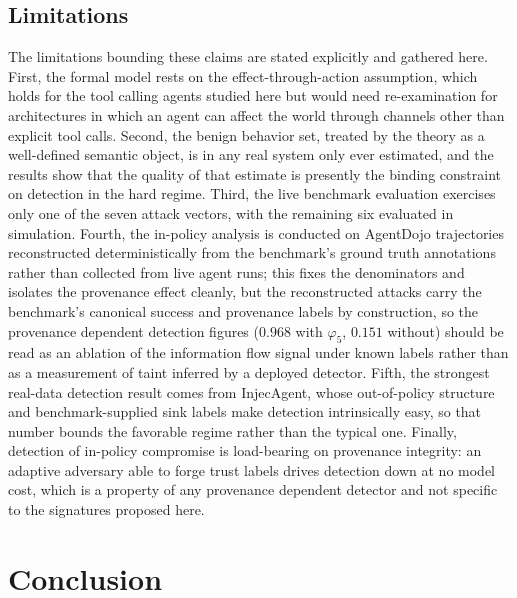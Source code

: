 \documentclass[journal]{IEEEtran}
\theoremstyle{remark}
\begin{document}
\subsection{Limitations}
The limitations bounding these claims are stated explicitly and gathered here. First, the formal model rests on the effect-through-action assumption, which holds for the tool calling agents studied here but would need re-examination for architectures in which an agent can affect the world through channels other than explicit tool calls. Second, the benign behavior set, treated by the theory as a well-defined semantic object, is in any real system only ever estimated, and the results show that the quality of that estimate is presently the binding constraint on detection in the hard regime. Third, the live benchmark evaluation exercises only one of the seven attack vectors, with the remaining six evaluated in simulation. Fourth, the in-policy analysis is conducted on AgentDojo trajectories reconstructed deterministically from the benchmark's ground truth annotations rather than collected from live agent runs; this fixes the denominators and isolates the provenance effect cleanly, but the reconstructed attacks carry the benchmark's canonical success and provenance labels by construction, so the provenance dependent detection figures ($0.968$ with $\varphi_5$, $0.151$ without) should be read as an ablation of the information flow signal under known labels rather than as a measurement of taint inferred by a deployed detector. Fifth, the strongest real-data detection result comes from InjecAgent, whose out-of-policy structure and benchmark-supplied sink labels make detection intrinsically easy, so that number bounds the favorable regime rather than the typical one. Finally, detection of in-policy compromise is load-bearing on provenance integrity: an adaptive adversary able to forge trust labels drives detection down at no model cost, which is a property of any provenance dependent detector and not specific to the signatures proposed here.

\section{Conclusion}
\end{document}
